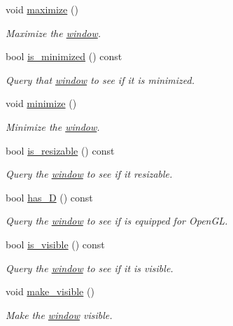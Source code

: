 \begin{DoxyCompactItemize}
void \hyperlink{classgfx_1_1window_a12b8c167d3d8dbad09614dcbf2d0289c}{maximize} ()
\begin{DoxyCompactList}\small\item\em Maximize the \hyperlink{classgfx_1_1window}{window}. \end{DoxyCompactList}\item 
bool \hyperlink{classgfx_1_1window_a0ea50f4c35f3865d22373030869d4c13}{is\-\_\-minimized} () const 
\begin{DoxyCompactList}\small\item\em Query that \hyperlink{classgfx_1_1window}{window} to see if it is minimized. \end{DoxyCompactList}\item 
void \hyperlink{classgfx_1_1window_ae05581143104ba2ba018dbb68f09bbcf}{minimize} ()
\begin{DoxyCompactList}\small\item\em Minimize the \hyperlink{classgfx_1_1window}{window}. \end{DoxyCompactList}\item 
bool \hyperlink{classgfx_1_1window_a648234253a466fdd73e9b2163f6a0e18}{is\-\_\-resizable} () const 
\begin{DoxyCompactList}\small\item\em Query the \hyperlink{classgfx_1_1window}{window} to see if it resizable. \end{DoxyCompactList}\item 
bool \hyperlink{classgfx_1_1window_a5960a89f750fb092efc66c1555644a9c}{has\-\_\-D} () const 
\begin{DoxyCompactList}\small\item\em Query the \hyperlink{classgfx_1_1window}{window} to see if is equipped for Open\-G\-L. \end{DoxyCompactList}\item 
bool \hyperlink{classgfx_1_1window_a6a85c290429b167c6be78f63265310e6}{is\-\_\-visible} () const 
\begin{DoxyCompactList}\small\item\em Query the \hyperlink{classgfx_1_1window}{window} to see if it is visible. \end{DoxyCompactList}\item 
void \hyperlink{classgfx_1_1window_aecd7d20bad566d001a6bded7b79964f8}{make\-\_\-visible} ()
\begin{DoxyCompactList}\small\item\em Make the \hyperlink{classgfx_1_1window}{window} visible. \end{DoxyCompactList}\item 

\end{DoxyCompactItemize}
